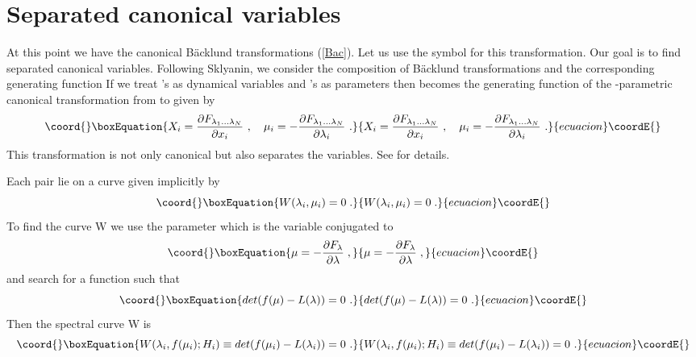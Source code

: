 \documentclass[a4paper,11pt]{article}
\begin{document}
\section{Separated canonical variables}
At this point we have the canonical B\"acklund transformations (\ref{Bac}).
Let us use the symbol \coordHE{} for this transformation. Our goal is to
find separated canonical variables. Following Sklyanin, we consider the
composition \coordHE{} of B\"acklund transformations and the corresponding
generating function \coordHE{} If we treat \myHighlight{$\lambda
$}\coordHE{}'s as dynamical variables and \coordHE{}'s as parameters then
\coordHE{} becomes the generating function of the
\coordHE{}-parametric canonical transformation from \coordHE{} to \myHighlight{$(\mu,\lambda)$}\coordHE{}
given by
\begin{equation}\coord{}\boxEquation{
\label{cans}
X_i=\frac{\partial F_{\lambda_1...\lambda_N}}{\partial x_i} ~,\quad
\mu_i=-\frac{\partial F_{\lambda_1...\lambda_N}}{\partial \lambda_i} ~.
}{
X_i=\frac{\partial F_{\lambda_1...\lambda_N}}{\partial x_i} ~,\quad
\mu_i=-\frac{\partial F_{\lambda_1...\lambda_N}}{\partial \lambda_i} ~.
}{ecuacion}\coordE{}\end{equation}
This transformation is not only canonical but also separates the variables.
See \cite{Kuz} for details.

Each pair \coordHE{} lie on a curve given implicitly by
\begin{equation}\coord{}\boxEquation{
\label{cu}
W(\lambda_i,\mu_i)=0\;.
}{
W(\lambda_i,\mu_i)=0\;.
}{ecuacion}\coordE{}\end{equation}
To find the curve W we use the parameter \myHighlight{$\mu $}\coordHE{} which is the variable
conjugated to \myHighlight{$\lambda $}\coordHE{}
\begin{equation}\coord{}\boxEquation{
\label{mu}
\mu =-\frac{\partial F_{\lambda}}{\partial \lambda}\;,
}{
\mu =-\frac{\partial F_{\lambda}}{\partial \lambda}\;,
}{ecuacion}\coordE{}\end{equation}
and search for a function \coordHE{} such that
\begin{equation}\coord{}\boxEquation{
\label{fmu}
det(f(\mu)-L(\lambda))=0 ~.
}{
det(f(\mu)-L(\lambda))=0 ~.
}{ecuacion}\coordE{}\end{equation}
Then the spectral curve W is
\begin{equation}\coord{}\boxEquation{
W(\lambda_i,f(\mu_i);{H_i})\equiv det(f(\mu_i)-L(\lambda_i))=0 ~.
}{
W(\lambda_i,f(\mu_i);{H_i})\equiv det(f(\mu_i)-L(\lambda_i))=0 ~.
}{ecuacion}\coordE{}\end{equation}
\end{document}

